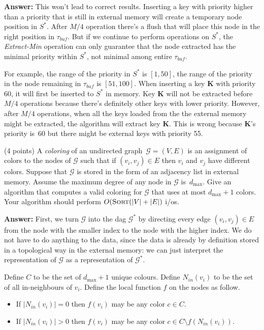 \documentclass{article}
\newcommand{\G}{\ensuremath{\mathcal{G}}}
\newcommand{\io}{{\sc i/o}\xspace}
\newcommand{\ios}{{\io}s\xspace}
\newcommand{\sort}{\mbox{\sc Sort}}
\newcounter{rcounter}
\newenvironment{rlist}%
{\begin{list}{\setnr-\arabic{rcounter}}{\usecounter{rcounter}}}{\end{list}}
\begin{document}
\begin{rlist}
    \textbf{Answer:}
    This won't lead to correct results. Inserting a key with priority higher than a priority that is still in external memory will create a temporary node position in $S^*$. After $M/4$ operation there's a flush that will place this node in the right position in $\tau_{buf}$. But if we continue to perform operations on $S^*$, the \emph{Extract-Min} operation can only guarantee that the node extracted has the minimal priority within $S^*$, not minimal among entire $\tau_{buf}$. 
        
    For example, the range of the priority in $S^*$ is $[1, 50]$, the range of the priority in the node remaining in $\tau_{buf}$ is $[51, 100]$. When inserting a key \textbf{K} with priority 60, it will first be inserted to $S^*$ in memory. Key \textbf{K} will not be extracted before $M/4$ operations because there's definitely other keys with lower priority. However, after $M/4$ operations, when all the keys loaded from the the external memory might be extracted, the algorithm will extract key \textbf{K}. This is wrong because \textbf{K}'s priority is~60 but there might be external keys with priority 55.

\item (4 points)
    A \emph{coloring} of an undirected graph~$\G=(V,E)$ is an assignment of colors to the nodes of $\G$ such that if $(v_i,v_j)\in E$ then $v_i$ and $v_j$ have different colors. Suppose that $\G$ is stored in the form of an adjacency list in external memory. Assume the maximum degree of any node in $\G$ is~$d_{\max}$. Give an algorithm that computes a valid coloring for $\G$ that uses at most $d_{\max}+1$ colors. Your algorithm should perform $O(\sort(|V|+|E|)$ \ios.
    
    \textbf{Answer:}
    First, we turn $\G$ into the {\sc dag} $\G^*$ by directing every edge $(v_i, v_j) \in E$ from the node with the smaller index to the node with the higher index. We do not have to do anything to the data, since the data is already by definition stored in a topological way in the external memory: we can just interpret the representation of $\G$ as a representation of $\G^*$.
    
    Define $C$ to be the set of $d_{\max}+1$ unique colours. Define $N_{in}(v_i)$ to be the set of all in-neighbours of $v_i$. Define the local function $f$ on the nodes as follow.
    \begin{itemize}
        \item
            If $|N_{in}(v_i)| = 0$ then $f(v_i)$ may be any color $c \in C$.
        \item
            If $|N_{in}(v_i)| > 0$ then $f(v_i)$ may be any color $c \in C \setminus f\left(N_{in}(v_i)\right)$.
    \end{itemize}
    

\end{rlist}
\end{document}
